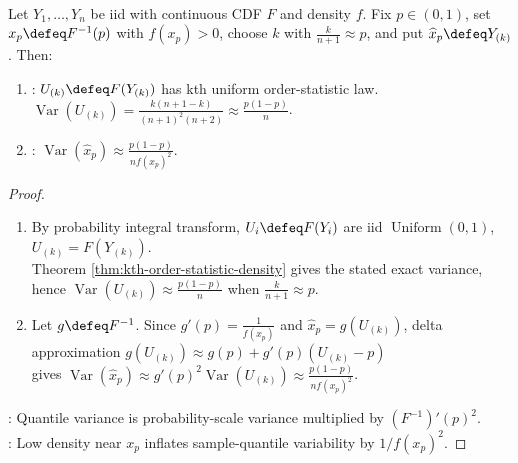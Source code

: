 \begin{proposition} \label{prop:sample-quantile-variance-delta-method} \\
Let $Y_1,\ldots,Y_n$ be iid with continuous CDF $F$ and density $f$. Fix $p\in(0,1)$, set $x_p\defeq F^{-1}(p)$ with $f(x_p)>0$, choose $k$ with $\frac{k}{n+1}\approx p$, and put $\widehat{x}_p\defeq Y_{(k)}$. Then:
\begin{enumerate}[label=(\roman*)]
\setlength{\itemsep}{0pt}
\item {}: $U_{(k)}\defeq F(Y_{(k)})$ has kth uniform order-statistic law. $\operatorname{Var}(U_{(k)})=\frac{k(n+1-k)}{(n+1)^2(n+2)}\approx\frac{p(1-p)}{n}$.
\item {}: $\operatorname{Var}(\widehat{x}_p)\approx\frac{p(1-p)}{n f(x_p)^2}$.
\end{enumerate}
\begin{proof}
\begin{enumerate}[label=(\roman*)]
\setlength{\itemsep}{0pt}
\item By probability integral transform, $U_i\defeq F(Y_i)$ are iid $\operatorname{Uniform}(0,1)$, $U_{(k)}=F(Y_{(k)})$.\\
Theorem \ref{thm:kth-order-statistic-density} gives the stated exact variance, hence $\operatorname{Var}(U_{(k)})\approx\frac{p(1-p)}{n}$ when $\frac{k}{n+1}\approx p$.
\item Let $g\defeq F^{-1}$. Since $g'(p)=\frac{1}{f(x_p)}$ and $\widehat{x}_p=g(U_{(k)})$, delta approximation $g(U_{(k)})\approx g(p)+g'(p)(U_{(k)}-p)$\\
gives $\operatorname{Var}(\widehat{x}_p)\approx g'(p)^2\operatorname{Var}(U_{(k)})\approx\frac{p(1-p)}{n f(x_p)^2}$.
\end{enumerate}
: Quantile variance is probability-scale variance multiplied by $(F^{-1})'(p)^2$.\\
: Low density near $x_p$ inflates sample-quantile variability by $1/f(x_p)^2$.
\end{proof}
\end{proposition}

